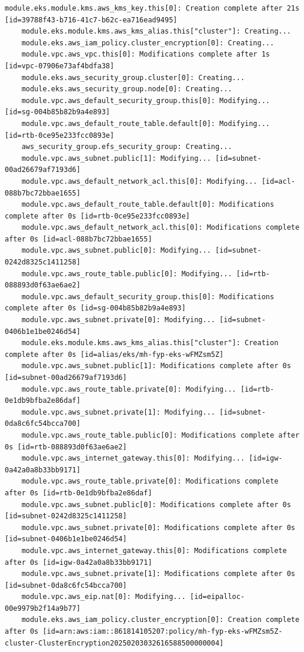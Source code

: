 \begin{lstlisting}[caption={\texttt{cloudkube} successful provisioning output}, breaklines=true, breakatwhitespace=false]
    module.eks.module.kms.aws_kms_key.this[0]: Creation complete after 21s [id=39788f43-b716-41c7-b62c-ea716ead9495]
    module.eks.module.kms.aws_kms_alias.this["cluster"]: Creating...
    module.eks.aws_iam_policy.cluster_encryption[0]: Creating...
    module.vpc.aws_vpc.this[0]: Modifications complete after 1s [id=vpc-07906e73af4bdfa38]
    module.eks.aws_security_group.cluster[0]: Creating...
    module.eks.aws_security_group.node[0]: Creating...
    module.vpc.aws_default_security_group.this[0]: Modifying... [id=sg-004b85b82b9a4e893]
    module.vpc.aws_default_route_table.default[0]: Modifying... [id=rtb-0ce95e233fcc0893e]
    aws_security_group.efs_security_group: Creating...
    module.vpc.aws_subnet.public[1]: Modifying... [id=subnet-00ad26679af7193d6]
    module.vpc.aws_default_network_acl.this[0]: Modifying... [id=acl-088b7bc72bbae1655]
    module.vpc.aws_default_route_table.default[0]: Modifications complete after 0s [id=rtb-0ce95e233fcc0893e]
    module.vpc.aws_default_network_acl.this[0]: Modifications complete after 0s [id=acl-088b7bc72bbae1655]
    module.vpc.aws_subnet.public[0]: Modifying... [id=subnet-0242d8325c1411258]
    module.vpc.aws_route_table.public[0]: Modifying... [id=rtb-088893d0f63ae6ae2]
    module.vpc.aws_default_security_group.this[0]: Modifications complete after 0s [id=sg-004b85b82b9a4e893]
    module.vpc.aws_subnet.private[0]: Modifying... [id=subnet-0406b1e1be0246d54]
    module.eks.module.kms.aws_kms_alias.this["cluster"]: Creation complete after 0s [id=alias/eks/mh-fyp-eks-wFMZsm5Z]
    module.vpc.aws_subnet.public[1]: Modifications complete after 0s [id=subnet-00ad26679af7193d6]
    module.vpc.aws_route_table.private[0]: Modifying... [id=rtb-0e1db9bfba2e86daf]
    module.vpc.aws_subnet.private[1]: Modifying... [id=subnet-0da8c6fc54bcca700]
    module.vpc.aws_route_table.public[0]: Modifications complete after 0s [id=rtb-088893d0f63ae6ae2]
    module.vpc.aws_internet_gateway.this[0]: Modifying... [id=igw-0a42a0a8b33bb9171]
    module.vpc.aws_route_table.private[0]: Modifications complete after 0s [id=rtb-0e1db9bfba2e86daf]
    module.vpc.aws_subnet.public[0]: Modifications complete after 0s [id=subnet-0242d8325c1411258]
    module.vpc.aws_subnet.private[0]: Modifications complete after 0s [id=subnet-0406b1e1be0246d54]
    module.vpc.aws_internet_gateway.this[0]: Modifications complete after 0s [id=igw-0a42a0a8b33bb9171]
    module.vpc.aws_subnet.private[1]: Modifications complete after 0s [id=subnet-0da8c6fc54bcca700]
    module.vpc.aws_eip.nat[0]: Modifying... [id=eipalloc-00e9979b2f14a9b77]
    module.eks.aws_iam_policy.cluster_encryption[0]: Creation complete after 0s [id=arn:aws:iam::861814105207:policy/mh-fyp-eks-wFMZsm5Z-cluster-ClusterEncryption20250203032616588500000004]

\end{lstlisting}
